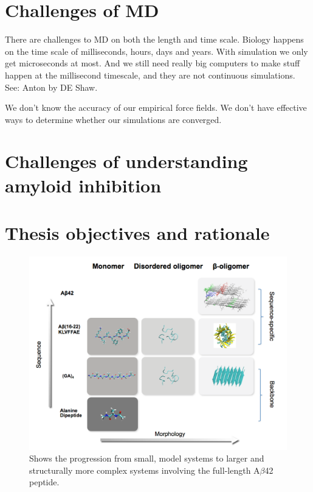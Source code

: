 \section{Challenges of MD}
\1 There are challenges to MD on both the length and time scale. Biology happens on the time scale of milliseconds, hours, days and years. With simulation we only get microseconds at most.  And we still need really big computers to make stuff happen at the millisecond timescale, and they are not continuous simulations. See: Anton by DE Shaw.

\1 We don't know the accuracy of our empirical force fields. We don't have effective ways to determine whether our simulations are converged.


\section{Challenges of understanding amyloid inhibition}


\section{Thesis objectives and rationale}
\begin{figure}
  \centering
  \includegraphics[width=6in]{figures/introduction/matrix.pdf}
  \caption[Rationale]{Shows the progression from small, model systems to larger and structurally more complex systems involving the full-length A$\beta$42 peptide.}
  \label{fig:rationale}
\end{figure}

